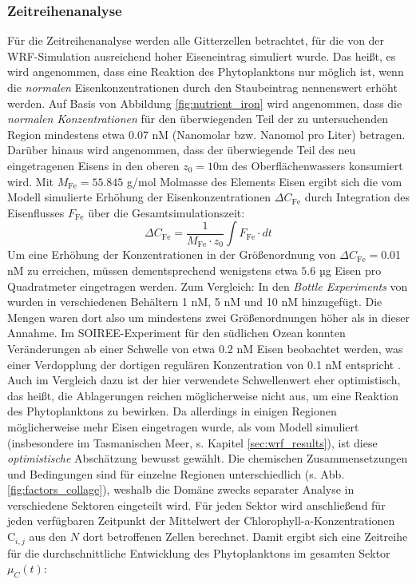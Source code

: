 \documentclass[12pt,a4paper,onecolumn]{scrartcl}
\begin{document}
\subsubsection{Zeitreihenanalyse} \label{sec:timeseries}
Für die Zeitreihenanalyse werden alle Gitterzellen betrachtet, für die von der WRF-Simulation ausreichend hoher Eiseneintrag simuliert wurde. Das heißt, es wird angenommen, dass eine Reaktion des Phytoplanktons nur möglich ist, wenn die \textit{normalen} Eisenkonzentrationen durch den Staubeintrag nennenswert erhöht werden. Auf Basis von Abbildung \ref{fig:nutrient_iron} wird angenommen, dass die \textit{normalen Konzentrationen} für den überwiegenden Teil der zu untersuchenden Region mindestens etwa 0.07 nM (Nanomolar bzw. Nanomol pro Liter) betragen. Darüber hinaus wird angenommen, dass der überwiegende Teil des neu eingetragenen Eisens in den oberen $z_0 = 10$m des Oberflächenwassers konsumiert wird. Mit  $M_{\text{Fe}} =  55.845$ g/mol Molmasse des Elements Eisen ergibt sich die vom Modell simulierte Erhöhung der Eisenkonzentrationen $\Delta C_\text{Fe}$ durch Integration des Eisenflusses $F_\text{Fe}$ über die Gesamtsimulationszeit:
\begin{equation}
\Delta C_\text{Fe} = \frac{1}{M_\text{Fe} \cdot z_0} \int F_\text{Fe} \cdot dt
\end{equation}
Um eine Erhöhung der Konzentrationen in der Größenordnung von $\Delta C_\text{Fe}=$0.01 nM zu erreichen, müssen dementsprechend wenigstens etwa $5.6$ µg Eisen pro Quadratmeter eingetragen werden. Zum Vergleich: In den \textit{Bottle Experiments} von \citet{Martin.1988} wurden in verschiedenen Behältern 1 nM, 5 nM und 10 nM hinzugefügt. Die Mengen waren dort also um mindestens zwei Größenordnungen höher als in dieser Annahme. Im SOIREE-Experiment für den südlichen Ozean \citep{Trull.2001} konnten Veränderungen ab einer Schwelle von etwa 0.2 nM Eisen beobachtet werden, was einer Verdopplung der dortigen regulären Konzentration von 0.1 nM entspricht \citep{Boyd.2010}. Auch im Vergleich dazu ist der hier verwendete Schwellenwert eher optimistisch, das heißt, die Ablagerungen reichen möglicherweise nicht aus, um eine Reaktion des Phytoplanktons zu bewirken. Da allerdings in einigen Regionen möglicherweise mehr Eisen eingetragen wurde, als vom Modell simuliert (insbesondere im Tasmanischen Meer, s. Kapitel \ref{sec:wrf_results}), ist diese \textit{optimistische} Abschätzung bewusst gewählt. Die  chemischen Zusammensetzungen und Bedingungen sind für einzelne Regionen unterschiedlich (s. Abb. \ref{fig:factors_collage}), weshalb die Domäne zwecks separater Analyse in verschiedene Sektoren eingeteilt wird. Für jeden Sektor wird anschließend für jeden verfügbaren Zeitpunkt der Mittelwert der Chlorophyll-a-Konzentrationen $\text{C}_{i,j}$ aus den $N$ dort betroffenen Zellen berechnet. Damit ergibt sich eine Zeitreihe für die durchschnittliche Entwicklung des Phytoplanktons im gesamten Sektor $\mu_C(t)$:
\end{document}
